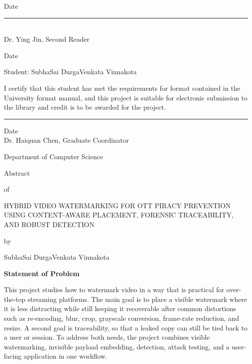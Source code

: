 \documentclass[12pt,oneside]{report}
\newcommand{\ReportTitle}{HYBRID VIDEO WATERMARKING FOR OTT PIRACY PREVENTION USING CONTENT-AWARE PLACEMENT, FORENSIC TRACEABILITY, AND ROBUST DETECTION}
\newcommand{\StudentName}{SubhaSai DurgaVenkata Vinnakota}
\newcommand{\DepartmentName}{Computer Science}
\newcommand{\SecondReader}{Dr. Ying Jin}
\newcommand{\GraduateCoordinator}{Dr. Haiquan Chen}
\begin{document}
\vspace{0.5in}
\noindent
\hspace*{0.1in}Date

\vspace{1.0in}
\noindent
\rule{4.5in}{0.4pt}\\
{\SecondReader, Second Reader}

\vspace{1.0in}
\noindent
\hspace*{0.1in}Date

\clearpage
\thispagestyle{empty}

\vspace*{2.0in}
\noindent
Student: \StudentName

\vspace{0.8in}
\noindent
I certify that this student has met the requirements for format contained in the University format manual, and this project is suitable for electronic submission to the library and credit is to be awarded for the project.

\vspace{1.0in}
\noindent
\rule{3.7in}{0.4pt}\hfill Date\\
\GraduateCoordinator, Graduate Coordinator

\vspace{0.8in}
\noindent
Department of \DepartmentName

\clearpage
\thispagestyle{empty}
\begin{center}
Abstract

\vspace{0.3in}
of

\vspace{0.3in}
\ReportTitle

\vspace{0.6in}
by

\vspace{0.3in}
\StudentName
\end{center}

\vspace{0.6in}
\noindent\textbf{Statement of Problem}

This project studies how to watermark video in a way that is practical for over-the-top streaming platforms. The main goal is to place a visible watermark where it is less distracting while still keeping it recoverable after common distortions such as re-encoding, blur, crop, grayscale conversion, frame-rate reduction, and resize. A second goal is traceability, so that a leaked copy can still be tied back to a user or session. To address both needs, the project combines visible watermarking, invisible payload embedding, detection, attack testing, and a user-facing application in one workflow.
\end{document}
